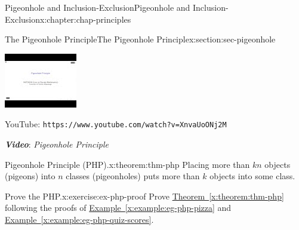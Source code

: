 \documentclass[oneside,10pt,]{book}
\newcommand{\xreffont}{\relax}
\newcommand{\mono}[1]{\texttt{#1}}
\newcommand{\alert}[1]{\textbf{\textit{#1}}}
\numberwithin{equation}{section}
\newlength{\qrsize}
\newlength{\previewwidth}
\begin{document}
\begin{chapterptx}{Pigeonhole and Inclusion-Exclusion}{}{Pigeonhole and Inclusion-Exclusion}{}{}{x:chapter:chap-principles}
\begin{sectionptx}{The Pigeonhole Principle}{}{The Pigeonhole Principle}{}{}{x:section:sec-pigeonhole}
\begin{sidebyside}{1}{0}{0}{0}
\begin{sbspanel}{1}%
\setlength{\qrsize}{9em}
\setlength{\previewwidth}{\linewidth}
\addtolength{\previewwidth}{-\qrsize}
\begin{tcbraster}[raster columns=2, raster column skip=1pt, raster halign=center, raster force size=false, raster left skip=0pt, raster right skip=0pt]%
\begin{tcolorbox}[previewstyle, width=\previewwidth]%
\includegraphics[width=0.80\linewidth,height=\qrsize,keepaspectratio]{images/video-pigeonhole.jpg}%
\end{tcolorbox}%
\begin{tcolorbox}[qrstyle]%
{\hypersetup{urlcolor=black}}%
\end{tcolorbox}%
\begin{tcolorbox}[captionstyle]%
\small YouTube: \mono{https://www.youtube.com/watch?v=XnvaUoONj2M}\end{tcolorbox}%
\end{tcbraster}%
\end{sbspanel}%
\end{sidebyside}%
\par
\alert{Video}: \emph{Pigeonhole Principle}%
\begin{theorem}{Pigeonhole Principle (PHP).}{}{x:theorem:thm-php}%
Placing more than \(kn\) objects (pigeons) into \(n\) classes (pigeonholes) puts more than \(k\) objects into some class.%
\end{theorem}
\begin{inlineexercise}{Prove the PHP.}{x:exercise:ex-php-proof}%
Prove \hyperref[x:theorem:thm-php]{Theorem~{\xreffont\ref{x:theorem:thm-php}}} following the proofs of \hyperref[x:example:eg-php-pizza]{Example~{\xreffont\ref{x:example:eg-php-pizza}}} and \hyperref[x:example:eg-php-quiz-scores]{Example~{\xreffont\ref{x:example:eg-php-quiz-scores}}}.%

\end{inlineexercise}
\end{sectionptx}
\end{chapterptx}
\end{document}
